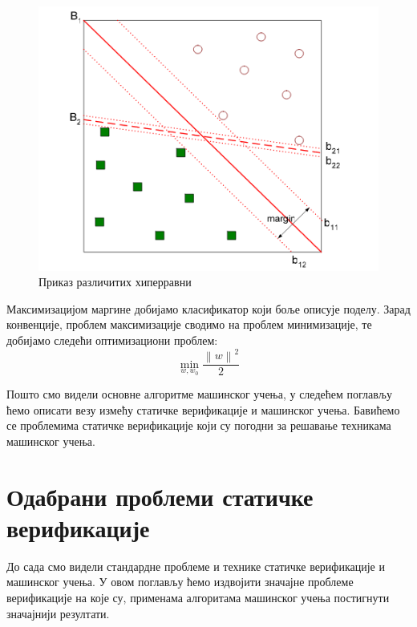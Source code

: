\documentclass[a4paper]{article}
\newcommand{\norm}[1]{\left\lVert#1\right\rVert}
\begin{document}
{\begin{figure}[h!]
\begin{center}
\includegraphics[scale=0.6]{svn.png}
\end{center}
\caption{Приказ различитих хиперравни}
\label{fig:svm}
\end{figure}


Максимизацијом маргине добијамо класификатор који боље описује поделу. Зарад конвенције, проблем максимизације сводимо на проблем минимизације, те добијамо следећи оптимизациони проблем:
\begin{equation}
    \min_{w, w_0} \frac{ {\norm{w}}^2 }{2}
\end{equation}


Пошто смо видели основне алгоритме машинског учења, у следећем поглављу ћемо описати везу измећу статичке верификације и машинског учења. Бавићемо се проблемима статичке верификације који су погодни за решавање техникама машинског учења.


\section{Одабрани проблеми статичке верификације}
До сада смо видели стандардне проблеме и технике статичке верификације и машинског учења. У овом поглављу ћемо издвојити значајне проблеме верификације на које су, применама алгоритама машинског учења постигнути значајнији резултати.


}
\end{document}
